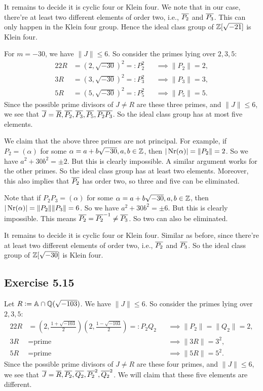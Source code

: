 \documentclass[../Marcus.tex]{subfiles}
\begin{document}
It remains to decide it is cyclic four or Klein four. We note that in our case, there're at least two different elements of order two, i.e., $\overline{P_2}$ and $\overline{P_3}$. This can only happen in the Klein four group. Hence the ideal class group of $\mathbb{Z}[\sqrt{-21}]$ is Klein four.

For $m=-30$, we have $\|J\| \leq 6$. So consider the primes lying over $2,3,5$:
\begin{alignat*}{2}
2R &= (2,\sqrt{-30})^2 =: P_2^2  &&\implies \|P_2\| = 2,   \\
3R &= (3,\sqrt{-30})^2 =: P_3^2  &&\implies \|P_3\| = 3,   \\
5R &= (5,\sqrt{-30})^2 =: P_5^2  &&\implies \|P_5\| = 5.
\end{alignat*}
Since the possible prime divisors of $J\neq R$ are these three primes, and $\|J\| \leq 6$, we see that $\overline{J}=\overline{R},\overline{P_2},\overline{P_3},\overline{P_5},\overline{P_2P_3}$. So the ideal class group has at most five elements.

We claim that the above three primes are not principal. For example, if $P_2 = (\alpha)$ for some $\alpha=a+b\sqrt{-30},a,b\in \mathbb{Z}$, then $|\operatorname{Nr}(\alpha)| = \|P_2\| = 2$. So we have $a^2+30b^2 = \pm2$. But this is clearly impossible. A similar argument works for the other primes. So the ideal class group has at least two elements. Moreover, this also implies that $\overline{P_2}$ has order two, so three and five can be eliminated.

Note that if $P_2P_3 = (\alpha)$ for some $\alpha=a+b\sqrt{-30},a,b\in \mathbb{Z}$, then $|\operatorname{Nr}(\alpha)| = \|P_2\|\|P_3\| = 6$. So we have $a^2+30b^2 = \pm6$. But this is clearly impossible. This means $\overline{P_2} = \overline{P_2}^{-1} \neq \overline{P_3}$. So two can also be eliminated.

It remains to decide it is cyclic four or Klein four. Similar as before, since there're at least two different elements of order two, i.e., $\overline{P_2}$ and $\overline{P_3}$. So the ideal class group of $\mathbb{Z}[\sqrt{-30}]$ is Klein four.

\subsection*{Exercise 5.15}

Let $R:=\mathbb{A}\cap\mathbb{Q}(\sqrt{-103})$. We have $\|J\| \leq 6$. So consider the primes lying over $2,3,5$:
\begin{alignat*}{2}
2R &= \left(2,\frac{1+\sqrt{-103}}{2}\right) \left(2,\frac{1-\sqrt{-103}}{2}\right)  =: P_2Q_2    &&\implies \|P_2\| = \|Q_2\| = 2,  \\
3R &= \text{prime}      &&\implies \|3R\| = 3^2, \\
5R &= \text{prime}      &&\implies \|5R\| = 5^2.
\end{alignat*}
Since the possible prime divisors of $J\neq R$ are these four primes, and $\|J\| \leq 6$, we see that $\overline{J}=\overline{R},\overline{P_2},\overline{Q_2},\overline{P_2}^2,\overline{Q_2}^2$. We will claim that these five elements are different.
\end{document}
